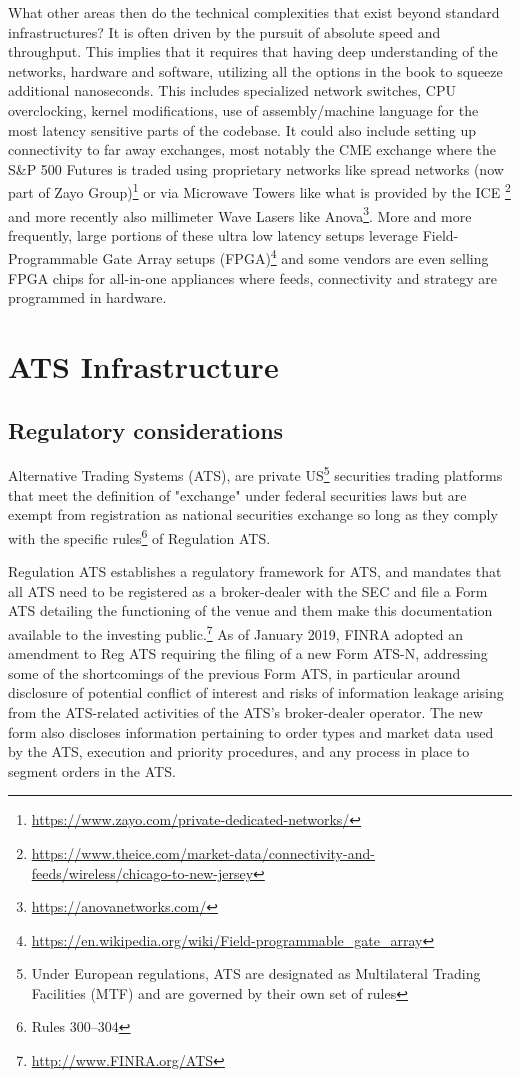 What other areas then do the technical complexities that exist beyond standard infrastructures? It is often driven by the pursuit of absolute speed and throughput. This implies that it requires that having deep understanding of the networks, hardware and software, utilizing all the options in the book to squeeze additional nanoseconds. This includes specialized network switches, CPU overclocking, kernel modifications, use of assembly/machine language for the most latency sensitive parts of the codebase. It could also include setting up connectivity to far away exchanges, most notably the CME exchange where the S\&P 500 Futures is traded using proprietary networks like spread networks (now part of Zayo Group)\footnote{\url{https://www.zayo.com/private-dedicated-networks/}} or via Microwave Towers like what is provided by the ICE \footnote{\url{https://www.theice.com/market-data/connectivity-and-feeds/wireless/chicago-to-new-jersey}} and more recently also millimeter Wave Lasers like Anova\footnote{\url{https://anovanetworks.com/}}. More and more frequently, large portions of these ultra low latency setups leverage Field-Programmable Gate Array setups (FPGA)\footnote{\url{https://en.wikipedia.org/wiki/Field-programmable_gate_array}} and some vendors are even selling FPGA chips for all-in-one appliances where  feeds, connectivity and strategy are programmed in hardware.



\section{ATS Infrastructure}
\subsection{Regulatory considerations}


Alternative Trading Systems (ATS), are private US\footnote{Under European regulations, ATS are designated as Multilateral Trading Facilities (MTF) and are governed by their own set of rules} securities trading platforms that meet the definition of "exchange" under federal securities laws but are exempt from registration as national securities exchange so long as they comply with the specific rules\footnote{Rules 300--304} of Regulation ATS.


Regulation ATS establishes a regulatory framework for ATS, and mandates that all ATS need to be registered as a broker-dealer with the SEC and file a Form ATS detailing the functioning of the venue and them make this documentation available to the investing public.\footnote{\url{http://www.FINRA.org/ATS}} As of January 2019, FINRA adopted an amendment to Reg ATS requiring the filing of a new Form ATS-N, addressing some of the shortcomings of the previous Form ATS, in particular around disclosure of potential conflict of interest and risks of information leakage arising from the ATS-related activities of the ATS's broker-dealer operator. The new form also discloses information pertaining to order types and market data used by the ATS, execution and priority procedures, and any process in place to segment orders in the ATS.


